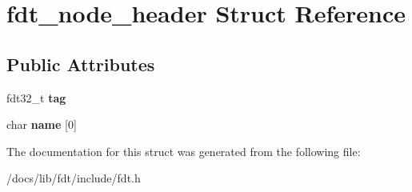 \hypertarget{structfdt__node__header}{}\section{fdt\+\_\+node\+\_\+header Struct Reference}
\label{structfdt__node__header}
\subsection*{Public Attributes}
\begin{DoxyCompactItemize}
\item 
\mbox{\label{structfdt__node__header_a073164a8ce430c15d2147ccba6bc7340}} 
fdt32\+\_\+t {\bfseries tag}
\item 
\mbox{\label{structfdt__node__header_aab823ddad5b747d212c38271e73e3388}} 
char {\bfseries name} \mbox{[}0\mbox{]}
\end{DoxyCompactItemize}


The documentation for this struct was generated from the following file\+:\begin{DoxyCompactItemize}
\item 
/docs/lib/fdt/include/fdt.\+h\end{DoxyCompactItemize}
